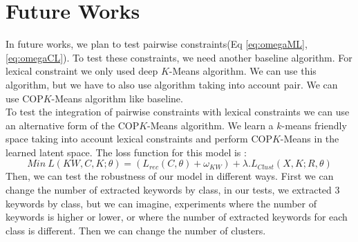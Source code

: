 \section{Future Works}
In future works, we plan to test pairwise constraints(Eq \ref{eq:omegaML}, 
\ref{eq:omegaCL}).
To test these  constraints, we need another baseline algorithm. For
lexical constraint we only used deep $K$-Means algorithm. We can use this
algorithm, but we have to also use algorithm taking into account pair. We can 
use COP$K$-Means algorithm like baseline.\\ 
To test the integration of pairwise constraints with lexical constraints we can 
use an alternative form of the  COP$K$-Means algorithm. We learn a $k$-means 
friendly space taking into account lexical constraints and perform COP$K$-Means
in the learned latent space. The loss function for this model is :
\begin{equation}
  Min~L(KW, C, K; \theta) = (L_{rec}(C, \theta) + \omega_{KW} )+
  \lambda.L_{Clust}(X, K;R, \theta)
\end{equation}
Then, we can test the robustness of our model in different ways.
First we can change the number of extracted keywords by class, in
our tests, we extracted 3 keywords by class, but we can imagine, experiments 
where the number of keywords is higher or lower, or where the number of 
extracted keywords for each class is different. Then we can change the number
of clusters.
